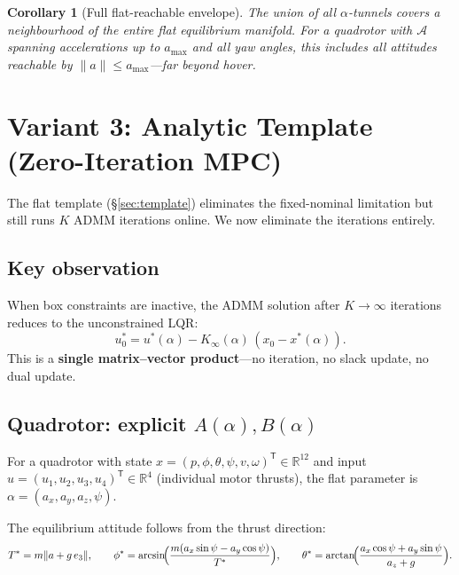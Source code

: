 \documentclass[11pt]{article}
\newtheorem{corollary}[theorem]{Corollary}
\newcommand{\R}{\mathbb{R}}
\newcommand{\norm}[1]{\|#1\|}
\newcommand{\trans}{\mathsf{T}}
\begin{document}
\begin{corollary}[Full flat-reachable envelope]
\label{cor:coverage}
The union of all $\alpha$-tunnels covers
a neighbourhood of the entire
flat equilibrium manifold.
For a quadrotor with $\mathcal{A}$ spanning
accelerations up to $a_{\max}$ and all yaw angles,
this includes all attitudes reachable
by $\norm{a} \le a_{\max}$---far beyond hover.
\end{corollary}

\section{Variant 3: Analytic Template (Zero-Iteration MPC)}
\label{sec:analytic}

The flat template (\S\ref{sec:template})
eliminates the fixed-nominal limitation
but still runs $K$ ADMM iterations online.
We now eliminate the iterations entirely.

\subsection{Key observation}

When box constraints are inactive,
the ADMM solution after $K\to\infty$ iterations
reduces to the unconstrained LQR:
\begin{equation}\label{eq:zero-iter}
  u_0^* = u^*(\alpha) - K_\infty(\alpha)\,
  (x_0 - x^*(\alpha)).
\end{equation}
This is a \textbf{single matrix--vector product}---no
iteration, no slack update, no dual update.

\subsection{Quadrotor: explicit $A(\alpha), B(\alpha)$}

For a quadrotor with state
$x = (p, \phi, \theta, \psi,
v, \omega)^\trans
\in \R^{12}$
and input $u = (u_1, u_2, u_3, u_4)^\trans \in \R^4$
(individual motor thrusts),
the flat parameter is
$\alpha = (a_x, a_y, a_z, \psi)$.

The equilibrium attitude follows from the
thrust direction:
\begin{equation}\label{eq:eq-attitude}
  T^* = m\norm{a + g\,e_3},
  \qquad
  \phi^* = \arcsin\!\Bigl(
    \frac{m(a_x \sin\psi - a_y \cos\psi)}{T^*}
  \Bigr),
  \qquad
  \theta^* = \arctan\!\Bigl(
    \frac{a_x \cos\psi + a_y \sin\psi}{a_z + g}
  \Bigr).
\end{equation}
\end{document}
